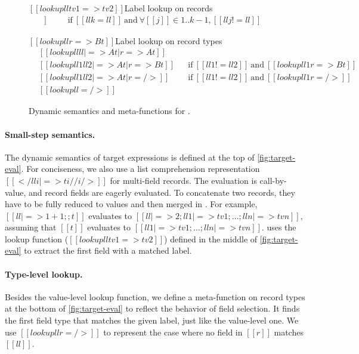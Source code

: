 \begin{figure}[t]
  \small
  \ottdefnsTargetStep

  \begin{rulesection}{$[[ lookup ll tv1 => tv2]]$}{Label lookup on records}
    \begin{align*}
      [[ lookup ll { ll1 |=> tv1 ; ... ; lln |=> tvn }  => tvk ]]\;\;\qquad
      \text{if}\ [[llk=ll]]\ \text{and}\ \forall [[j]] \in 1 .. k\!\!-\!\!1, [[llj != ll]]\;\;
    \end{align*}
  \end{rulesection}

  \begin{rulesection}{$[[ lookup ll r => Bt]]$}{Label lookup on record types}
    \begin{align*}
      &[[ lookup ll {ll |=>At | r} => At ]]&&\\
      &[[ lookup ll1 {ll2 |=>At | r} => Bt ]]&&\text{if}\ [[ll1 != ll2]]\ \text{and}\ [[ lookup ll1 r => Bt ]]\\
      &[[ lookup ll1 {ll2 |=>At | r} =/> ]]&&\text{if}\ [[ll1 != ll2]]\ \text{and}\ [[ lookup ll1 r =/> ]]\\
      &[[ lookup ll {} =/> ]]&&
    \end{align*}
  \end{rulesection}

  \caption{Dynamic semantics and meta-functions for \lambdar.}
  \label{fig:target-eval}
\end{figure}

\paragraph{Small-step semantics.}
The dynamic semantics of target expressions is defined at the top of
\autoref{fig:target-eval}. For conciseness, we also use a list comprehension
representation $[[ { </ lli |=> ti // i /> } ]]$ for multi-field records. The
evaluation is call-by-value, and record fields are eagerly evaluated. To
concatenate two records, they have to be fully reduced to values and then merged
in . For example, $[[{ ll|=>1+1 } ;; t]]$ evaluates to
$[[{ ll |=> 2 ; ll1 |=> tv1 ; ... ; lln |=> tvn }]]$, assuming that $[[t]]$
evaluates to $[[{ ll1 |=> tv1 ; ... ; lln |=> tvn }]]$. 
uses the lookup function ($[[lookup ll tv1 => tv2]]$) defined in the middle of
\autoref{fig:target-eval} to extract the first field with a matched label.

\paragraph{Type-level lookup.}
Besides the value-level lookup function, we define a meta-function on record
types at the bottom of \autoref{fig:target-eval} to reflect the behavior of
field selection. It finds the first field type that matches the given label,
just like the value-level one. We use $[[ lookup ll r =/> ]]$ to represent the
case where no field in $[[r]]$ matches $[[ll]]$.

